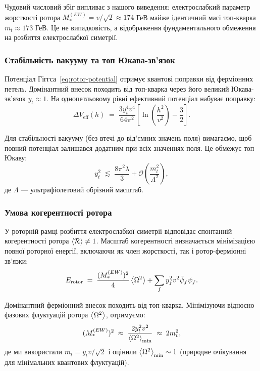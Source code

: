 \documentclass[11pt,a4paper]{article}
\newcommand{\Rotor}{\mathcal{R}}
\theoremstyle{definition}
\theoremstyle{plain}
\theoremstyle{remark}
\begin{document}
Чудовий числовий збіг випливає з нашого виведення: електрослабкий параметр жорсткості ротора $M_*^{(EW)} = v/\sqrt{2} \approx 174$ ГеВ майже ідентичний масі топ-кварка $m_t \approx 173$ ГеВ. Це не випадковість, а відображення фундаментального обмеження на розбиття електрослабкої симетрії.

\subsubsection{Стабільність вакууму та топ Юкава-зв'язок}

Потенціал Гіггса~\eqref{eq:rotor-potential} отримує квантові поправки від ферміонних петель. Домінантний внесок походить від топ-кварка через його великий Юкава-зв'язок $y_t \approx 1$. На однопетльовому рівні ефективний потенціал набуває поправку:
\begin{equation}
\Delta V_{\text{eff}}(h) \;=\; \frac{3y_t^4 v^4}{64\pi^2}\left[\ln\left(\frac{h^2}{v^2}\right) - \frac{3}{2}\right].
\end{equation}

Для стабільності вакууму (без втечі до від'ємних значень поля) вимагаємо, щоб повний потенціал залишався додатним при всіх значеннях поля. Це обмежує топ Юкаву:
\begin{equation}
y_t^2 \;\lesssim\; \frac{8\pi^2\lambda}{3} + \mathcal{O}\left(\frac{m_t^2}{\Lambda^2}\right),
\end{equation}
де $\Lambda$ — ультрафіолетовий обрізний масштаб.

\subsubsection{Умова когерентності ротора}

У роторній рамці розбиття електрослабкої симетрії відповідає спонтанній когерентності ротора $\ev{\Rotor} \neq 1$. Масштаб когерентності визначається мінімізацією повної роторної енергії, включаючи як член жорсткості, так і ротор-ферміонні зв'язки:
\begin{equation}
E_{\text{rotor}} \;=\; \frac{(M_*^{(EW)})^2}{4}\ev{\Omega^2} + \sum_f y_f^2 v^2 \bar{\psi}_f\psi_f.
\end{equation}

Домінантний ферміонний внесок походить від топ-кварка. Мінімізуючи відносно фазових флуктуацій ротора $\ev{\Omega^2}$, отримуємо:
\begin{equation}
(M_*^{(EW)})^2 \;\approx\; \frac{2y_t^2 v^2}{\ev{\Omega^2}_{\min}} \;\approx\; 2m_t^2,
\end{equation}
де ми використали $m_t = y_t v/\sqrt{2}$ і оцінили $\ev{\Omega^2}_{\min} \sim 1$ (природне очікування для мінімальних квантових флуктуацій).
\end{document}
